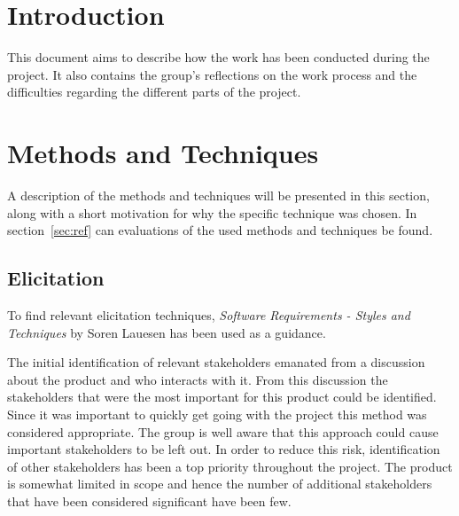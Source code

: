 \documentclass[10pt,a4paper]{article}
\begin{document}
\section{Introduction}
This document aims to describe how the work has been conducted during the project. It also contains the group's reflections on the work process and the difficulties regarding the different parts of the project. 


\section{Methods and Techniques}
\label{sec:mat}
A description of the methods and techniques will be presented in this section, along with a short motivation for why the specific technique was chosen. In section~\ref{sec:ref} can evaluations of the used methods and techniques be found.

\subsection{Elicitation}
To find relevant elicitation techniques, \textit{Software Requirements - Styles and Techniques} by Soren Lauesen has been used as a guidance\cite{soren}.

The initial identification of relevant stakeholders emanated from a discussion about the product and who interacts with it. From this discussion the stakeholders that were the most important for this product could be identified. Since it was important to quickly get going with the project this method was considered appropriate. The group is well aware that this approach could cause important stakeholders to be left out. In order to reduce this risk, identification of other stakeholders has been a top priority throughout the project. The product is somewhat limited in scope and hence the number of additional stakeholders that have been considered significant have been few. 
\end{document}
